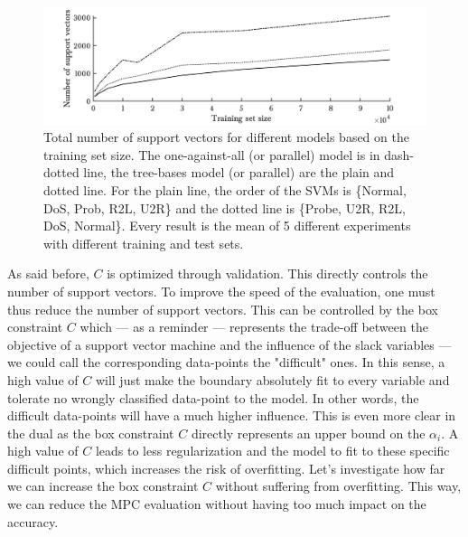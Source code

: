 \begin{figure}[h!]
    \centering
    \includegraphics[width=1\textwidth]{parts/chap-4/img-svm/svm-nl-sv.png}
    \caption[Number of support vectors for different models.]{Total number of support vectors for different models based on the training set size. The one-against-all (or parallel) model is in dash-dotted line, the tree-bases model (or parallel) are the plain and dotted line. For the plain line, the order of the SVMs is \{Normal, DoS, Prob, R2L, U2R\} and the dotted line is \{Probe, U2R, R2L, DoS, Normal\}. Every result is the mean of 5 different experiments with different training and test sets.}
    \label{fig:svm-nl-sv}
\end{figure}

As said before, $C$ is optimized through validation. This directly controls the number of support vectors. To improve the speed of the evaluation, one must thus reduce the number of support vectors. This can be controlled by the box constraint $C$ which --- as a reminder --- represents the trade-off between the objective of a support vector machine and the influence of the slack variables --- we could call the corresponding data-points the "difficult" ones. In this sense, a high value of $C$ will just make the boundary absolutely fit to every variable and tolerate no wrongly classified data-point to the model. In other words, the difficult data-points will have a much higher influence. This is even more clear in the dual as the box constraint $C$ directly represents an upper bound on the $\alpha_i$. A high value of $C$ leads to less regularization and the model to fit to these specific difficult points, which increases the risk of overfitting. Let's investigate how far we can increase the box constraint $C$ without suffering from overfitting. This way, we can reduce the MPC evaluation without having too much impact on the accuracy.


